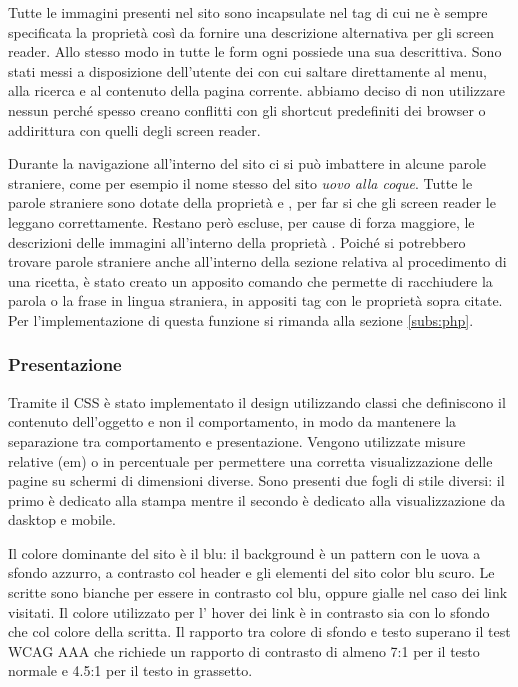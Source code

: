 Tutte le immagini presenti nel sito sono incapsulate nel tag  di cui ne è sempre specificata la proprietà  così da fornire una descrizione alternativa per gli screen reader. Allo stesso modo in tutte le form ogni  possiede una sua  descrittiva. Sono stati messi a disposizione dell'utente dei  con cui saltare direttamente al menu, alla ricerca e al contenuto della pagina corrente. abbiamo deciso di non utilizzare nessun  perché spesso creano conflitti con gli shortcut predefiniti dei browser o addirittura con quelli degli screen reader.

Durante la navigazione all'interno del sito ci si può imbattere in alcune parole straniere, come per esempio il nome stesso del sito \emph{uovo alla coque}. Tutte le parole straniere sono dotate della proprietà  e , per far si che gli screen reader le leggano correttamente. Restano però escluse, per cause di forza maggiore, le descrizioni delle immagini all'interno della proprietà . Poiché si potrebbero trovare parole straniere anche all'interno della sezione relativa al procedimento di una ricetta, è stato creato un apposito comando che permette di racchiudere la parola o la frase in lingua straniera, in appositi tag con le proprietà sopra citate. Per l'implementazione di questa funzione si rimanda alla sezione \ref{subs:php}.

\subsubsection{Presentazione}
Tramite il CSS è stato implementato il design utilizzando classi che definiscono il contenuto dell'oggetto e non il comportamento, in modo da mantenere la separazione tra comportamento e presentazione. Vengono utilizzate misure relative (em) o in percentuale per permettere una corretta visualizzazione delle pagine su schermi di dimensioni diverse. Sono presenti due fogli di stile diversi: il primo è dedicato alla stampa mentre il secondo è dedicato alla visualizzazione da dasktop e mobile.

Il colore dominante del sito è il blu: il background è un pattern con le uova a sfondo azzurro, a contrasto col header e gli elementi del sito color blu scuro. Le scritte sono bianche per essere in contrasto col blu, oppure gialle nel caso dei link visitati. Il colore utilizzato per l' hover dei link è in contrasto sia con lo sfondo che col colore della scritta. Il rapporto tra colore di sfondo e testo superano il test WCAG AAA che richiede un rapporto di contrasto di almeno 7:1 per il testo normale e 4.5:1 per il testo in grassetto.

